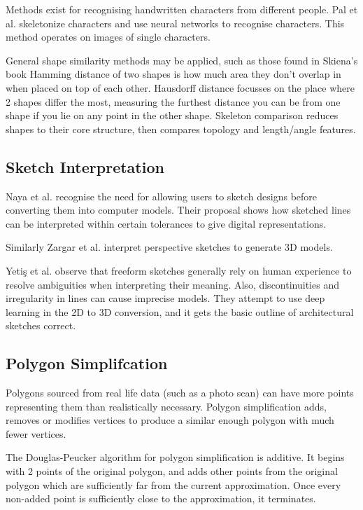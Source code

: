 \documentclass[11pt]{IEEEtran}
\begin{document}
Methods exist for recognising handwritten characters from different people. Pal et al. \cite{pal2010handwritten} skeletonize characters and use neural networks to recognise characters. This method operates on images of single characters.

General shape similarity methods may be applied, such as those found in Skiena's book \cite{skiena2020algorithm} Hamming distance of two shapes is how much area they don't overlap in when placed on top of each other. Hausdorff distance focusses on the place where 2 shapes differ the most, measuring the furthest distance you can be from one shape if you lie on any point in the other shape. Skeleton comparison reduces shapes to their core structure, then compares topology and length/angle features.

\subsection{Sketch Interpretation}

Naya et al. \cite{naya2002direct} recognise the need for allowing users to sketch designs before converting them into computer models. Their proposal shows how sketched lines can be interpreted within certain tolerances to give digital representations. 

Similarly Zargar et al. \cite{zargar2019introducing} interpret perspective sketches to generate 3D models.

Yetiş et al. \cite{yetics2019auto} observe that freeform sketches generally rely on human experience to resolve ambiguities when interpreting their meaning. Also, discontinuities and irregularity in lines can cause imprecise models. They attempt to use deep learning in the 2D to 3D conversion, and it gets the basic outline of architectural sketches correct.

\subsection{Polygon Simplifcation}

Polygons sourced from real life data (such as a photo scan) can have more points representing them than realistically necessary. Polygon simplification adds, removes or modifies vertices to produce a similar enough polygon with much fewer vertices.

The Douglas-Peucker algorithm \cite{douglas1973algorithms} for polygon simplification is additive. It begins with 2 points of the original polygon, and adds other points from the original polygon which are sufficiently far from the current approximation. Once every non-added point is sufficiently close to the approximation, it terminates.
\end{document}
